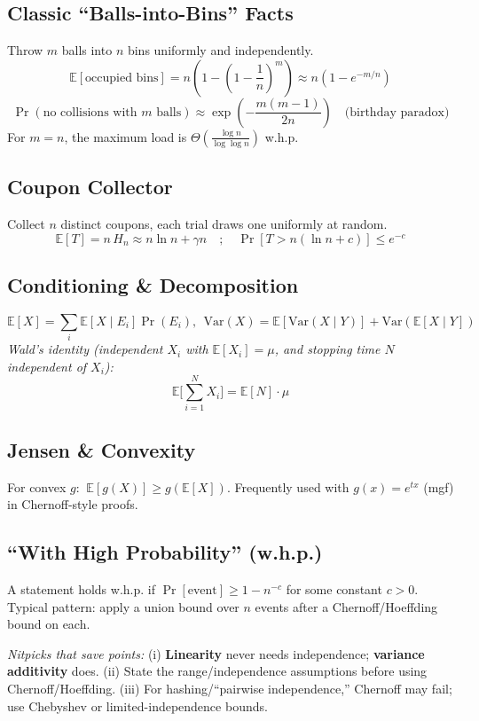 \documentclass[10pt]{article}
\theoremstyle{definition}
\begin{document}
\subsection{Classic “Balls-into-Bins” Facts}
Throw $m$ balls into $n$ bins uniformly and independently.
\[
\mathbb{E}[\text{occupied bins}] = n\left(1-\left(1-\frac{1}{n}\right)^{\!m}\right)\approx n\left(1-e^{-m/n}\right)
\]
\[
\Pr(\text{no collisions with }m\text{ balls})\approx \exp\!\left(-\frac{m(m-1)}{2n}\right)\quad\text{(birthday paradox)}
\]
For $m=n$, the maximum load is $\Theta\!\left(\frac{\log n}{\log\log n}\right)$ w.h.p.

\subsection{Coupon Collector}
Collect $n$ distinct coupons, each trial draws one uniformly at random.
\[
\mathbb{E}[T]=n\,H_n\approx n\ln n+\gamma n\quad;\quad \Pr\!\left[T>n(\ln n+c)\right]\le e^{-c}
\]

\subsection{Conditioning \& Decomposition}
\[
\mathbb{E}[X]=\sum_{i} \mathbb{E}[X\mid E_i]\Pr(E_i),\ \ \mathrm{Var}(X)=\mathbb{E}[\mathrm{Var}(X\mid Y)]+\mathrm{Var}(\mathbb{E}[X\mid Y])
\]
\emph{Wald’s identity (independent $X_i$ with $\mathbb{E}[X_i]=\mu$, and stopping time $N$ independent of $X_i$): }
\[
\mathbb{E}\Big[\sum_{i=1}^N X_i\Big]=\mathbb{E}[N]\cdot \mu
\]

\subsection{Jensen \& Convexity}
For convex $g$: $\ \mathbb{E}[g(X)]\ge g(\mathbb{E}[X])$. Frequently used with $g(x)=e^{tx}$ (mgf) in Chernoff-style proofs.

\subsection{“With High Probability” (w.h.p.)}
A statement holds w.h.p. if $\Pr[\text{event}]\ge 1 - n^{-c}$ for some constant $c>0$. Typical pattern: apply a union bound over $n$ events after a Chernoff/Hoeffding bound on each.

\smallskip
\noindent\textit{Nitpicks that save points:}
(i) \textbf{Linearity} never needs independence; \textbf{variance additivity} does. 
(ii) State the range/independence assumptions before using Chernoff/Hoeffding. 
(iii) For hashing/“pairwise independence,” Chernoff may fail; use Chebyshev or limited-independence bounds.
\end{document}

